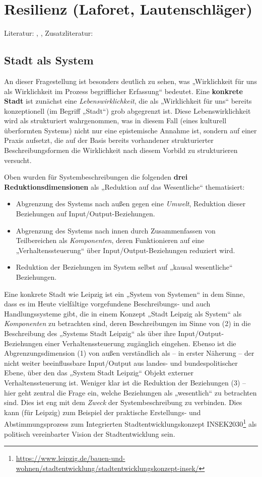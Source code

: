 \documentclass[11pt,a4paper]{article}
\begin{document}
\section{Resilienz (Laforet, Lautenschläger)}

Literatur: \cite{Holling2000}, \cite{Walker2004}, Zusatzliteratur:
\cite{Brand2007}

\subsection{Stadt als System}

An dieser Fragestellung ist besonders deutlich zu sehen, was „Wirklichkeit für
uns als Wirklichkeit im Prozess begriff\-licher Erfassung“ bedeutet. Eine
\textbf{konkrete Stadt} ist zunächst eine \emph{Lebenswirklichkeit}, die als
„Wirklichkeit für uns“ bereits konzeptionell (im Begriff „Stadt“) grob
abgegrenzt ist. Diese Lebenswirklichkeit wird als strukturiert wahrgenommen,
was in diesem Fall (eines kulturell überformten Systems) nicht nur eine
epistemische Annahme ist, sondern auf einer Praxis aufsetzt, die auf der Basis
bereits vorhandener strukturierter Beschreibungsformen die Wirklichkeit nach
diesem Vorbild zu strukturieren versucht.

Oben wurden für Systembeschreibungen die folgenden \textbf{drei
  Reduktionsdimensionen} als „Reduktion auf das Wesentliche“ thematisiert:
\begin{itemize}[noitemsep]
\item[1.] Abgrenzung des Systems nach außen gegen eine \emph{Umwelt},
  Reduktion dieser Beziehungen auf Input/Output-Beziehungen.
\item[2.] Abgrenzung des Systems nach innen durch Zusammenfassen von
  Teilbereichen als \emph{Komponenten}, deren Funktionieren auf eine
  „Verhaltenssteuerung“ über Input/Output-Be\-ziehungen reduziert wird.
\item[3.] Reduktion der Beziehungen im System selbst auf „kausal wesentliche“
  Beziehungen.
\end{itemize}
Eine konkrete Stadt wie Leipzig ist ein „System von Systemen“ in dem Sinne,
dass es im Heute vielfältige vorgefundene Beschreibungs- und auch
Handlungssysteme gibt, die in einem Konzept „Stadt Leipzig als System“ als
\emph{Komponenten} zu betrachten sind, deren Beschreibungen im Sinne von (2)
in die Beschreibung des „Systems Stadt Leipzig“ als über ihre
Input/Output-Beziehungen einer Verhaltenssteuerung zugänglich eingehen.
Ebenso ist die Abgrenzungsdimension (1) von außen verständlich als -- in
erster Näherung -- der nicht weiter beeinflussbare Input/Output aus landes-
und bundespolitischer Ebene, über den das „System Stadt Leipzig“ Objekt
externer Verhaltenssteuerung ist. Weniger klar ist die Reduktion der
Beziehungen (3) -- hier geht zentral die Frage ein, welche Beziehungen als
„wesentlich“ zu betrachten sind. Dies ist eng mit dem \emph{Zweck} der
Systembeschreibung zu verbinden. Dies kann (für Leipzig) zum Beispiel der
praktische Erstellungs- und Abstimmungsprozess zum Integrierten
Stadtentwicklungskonzept
INSEK2030\footnote{\url{https://www.leipzig.de/bauen-und-wohnen/stadtentwicklung/stadtentwicklungskonzept-insek/}}
als politisch vereinbarter Vision der Stadtentwicklung sein.
\end{document}
